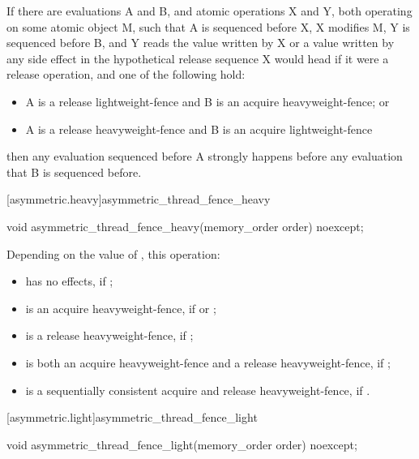 \pnum
If there are evaluations A and B, and atomic operations X and Y, both operating on some atomic
object M, such that A is sequenced before X, X modifies M, Y is sequenced before B, and Y
reads the value written by X or a value written by any side effect in the hypothetical release
sequence X would head if it were a release operation, and one of the following hold:
\begin{itemize}
    \item  A is a release lightweight-fence and B is an acquire heavyweight-fence; or
\item  A is a release heavyweight-fence and B is an acquire lightweight-fence
\end{itemize}

then any evaluation sequenced before A strongly happens before any evaluation that B is
sequenced before.


[asymmetric.heavy]{asymmetric_thread_fence_heavy}
\begin{itemdecl}
void asymmetric_thread_fence_heavy(memory_order order) noexcept;
\end{itemdecl}

\begin{itemdescr}


\pnum
\effects
Depending on the value of , this operation:
\begin{itemize}
    \item  has no effects, if ;
\item  is an acquire heavyweight-fence, if  or ;
\item is a release heavyweight-fence, if ;
\item is both an acquire heavyweight-fence and a release heavyweight-fence, if ;
\item is a sequentially consistent acquire and release heavyweight-fence, if .
\end{itemize}

\end{itemdescr}

[asymmetric.light]{asymmetric_thread_fence_light}
\begin{itemdecl}
void asymmetric_thread_fence_light(memory_order order) noexcept;
\end{itemdecl}

